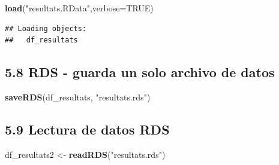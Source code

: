 \documentclass[
]{article}
\newenvironment{Shaded}{\begin{snugshade}}{\end{snugshade}}
\newcommand{\AttributeTok}[1]{\textcolor[rgb]{0.13,0.29,0.53}{#1}}
\newcommand{\ConstantTok}[1]{\textcolor[rgb]{0.56,0.35,0.01}{#1}}
\newcommand{\FunctionTok}[1]{\textcolor[rgb]{0.13,0.29,0.53}{\textbf{#1}}}
\newcommand{\NormalTok}[1]{#1}
\newcommand{\OtherTok}[1]{\textcolor[rgb]{0.56,0.35,0.01}{#1}}
\newcommand{\StringTok}[1]{\textcolor[rgb]{0.31,0.60,0.02}{#1}}
\begin{document}
\begin{Shaded}
\begin{Highlighting}[]
\FunctionTok{load}\NormalTok{(}\StringTok{"resultats.RData"}\NormalTok{,}\AttributeTok{verbose=}\ConstantTok{TRUE}\NormalTok{)}
\end{Highlighting}
\end{Shaded}

\begin{verbatim}
## Loading objects:
##   df_resultats
\end{verbatim}

\hypertarget{rds---guarda-un-solo-archivo-de-datos}{%
\subsection{5.8 RDS - guarda un solo archivo de
datos}\label{rds---guarda-un-solo-archivo-de-datos}}

\begin{Shaded}
\begin{Highlighting}[]
\FunctionTok{saveRDS}\NormalTok{(df\_resultats, }\StringTok{"resultats.rds"}\NormalTok{)}
\end{Highlighting}
\end{Shaded}

\hypertarget{lectura-de-datos-rds}{%
\subsection{5.9 Lectura de datos RDS}\label{lectura-de-datos-rds}}

\begin{Shaded}
\begin{Highlighting}[]
\NormalTok{df\_resultats2 }\OtherTok{\textless{}{-}} \FunctionTok{readRDS}\NormalTok{(}\StringTok{"resultats.rds"}\NormalTok{)}
\end{Highlighting}
\end{Shaded}
\end{document}
